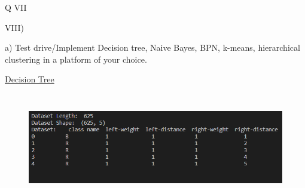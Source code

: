 \documentclass[12pt]{article}
\renewcommand{\_}{\kern-1.5pt\textunderscore\kern-1.5pt}
\begin{document}
\vspace{\baselineskip}

\vspace{\baselineskip}

\vspace{\baselineskip}
\begin{Center}
{\fontsize{28pt}{33.6pt}\selectfont Q VII\par}
\end{Center}\par

{\fontsize{14pt}{16.8pt}\selectfont VIII) \par}\par

{\fontsize{14pt}{16.8pt}\selectfont a) Test drive/Implement Decision tree, Naive Bayes, BPN, k-means, hierarchical clustering in a platform of your choice.\par}\par

{\fontsize{14pt}{16.8pt}\selectfont \uline{Decision Tree}\par}\par




\begin{figure}[H]
	\begin{Center}
		\includegraphics[width=6.5in,height=1.86in]{./media/image11.png}
	\end{Center}
\end{figure}



\par



\end{document}
